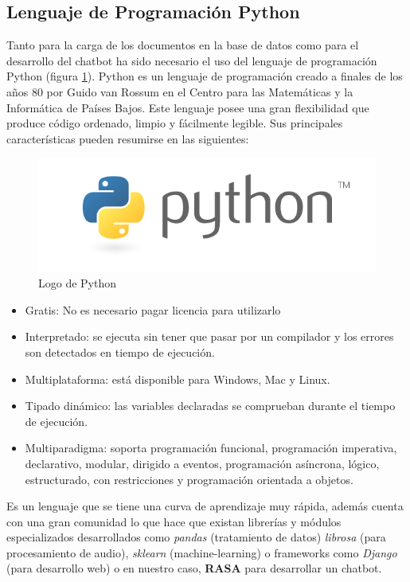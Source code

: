 \newpage
\subsection{Lenguaje de Programación Python}

Tanto para la carga de los documentos en la base de datos como para el desarrollo del chatbot ha sido necesario el uso del lenguaje de programación Python (figura \ref{fig:Python}). Python es un lenguaje de programación creado a finales de los años 80 por Guido van Rossum en el Centro para las Matemáticas y la Informática de Países Bajos. Este lenguaje posee una gran flexibilidad que produce código ordenado, limpio y fácilmente legible. Sus principales características pueden resumirse en las siguientes\cite{python}:

\begin{figure}[h]
    \centering
    \includegraphics[scale=0.4]{include/figuras/python.png}
    \caption{Logo de Python}
    \label{fig:Python}
\end{figure}

\begin{itemize}
    \item Gratis: No es necesario pagar licencia para utilizarlo
    \item Interpretado: se ejecuta sin tener que pasar por un compilador y los errores son detectados en tiempo de ejecución.
    \item Multiplataforma: está disponible para Windows, Mac y Linux. 
    \item Tipado dinámico: las variables declaradas se comprueban durante el tiempo de ejecución.
    \item Multiparadigma: soporta programación funcional, programación imperativa, declarativo, modular, dirigido a eventos, programación asíncrona, lógico, estructurado, con restricciones y programación orientada a objetos.
\end{itemize}

Es un lenguaje que se tiene una curva de aprendizaje muy rápida, además cuenta con una gran comunidad lo que hace que existan librerías y módulos especializados desarrollados como \textit{pandas} (tratamiento de datos) \textit{librosa} (para procesamiento de audio), \textit{sklearn} (machine-learning) o frameworks como \textit{Django} (para desarrollo web) o en nuestro caso, \textbf{RASA} para desarrollar un chatbot. 

